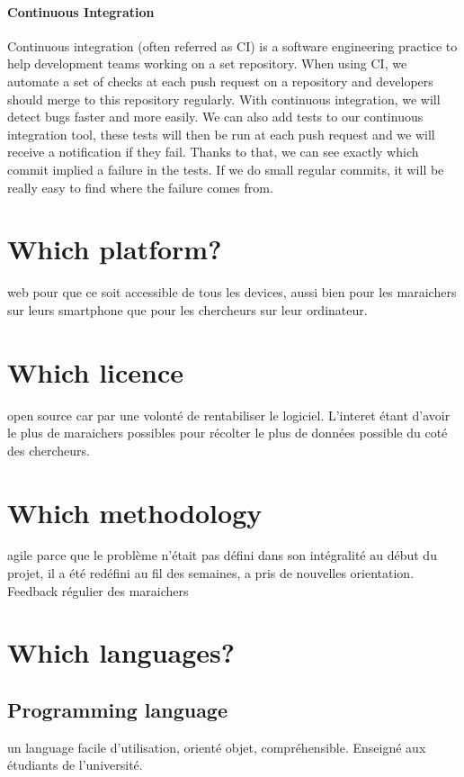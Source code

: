 \paragraph{Continuous Integration}
Continuous integration (often referred as CI) is a software engineering practice to help development teams working on a set repository. 
When using CI, we automate a set of checks at each push request on a repository and developers should merge to this repository regularly. With continuous integration, we will detect bugs faster and more easily. We can also add tests to our continuous integration tool, these tests will then be run at each push request and we will receive a notification if they fail. Thanks to that, we can see exactly which commit implied a failure in the tests. If we do small regular commits, it will be really easy to find where the failure comes from.



\section{Which platform?}
web pour que ce soit accessible de tous les devices, aussi bien pour les maraichers sur leurs smartphone que pour les chercheurs sur leur ordinateur.

\section{Which licence}
open source car par une volonté de rentabiliser le logiciel. L'interet étant d'avoir le plus de maraichers possibles pour récolter le plus de données possible du coté des chercheurs.

\section{Which methodology}
agile parce que le problème n'était pas défini dans son intégralité au début du projet, il a été redéfini au fil des semaines, a pris de nouvelles orientation. Feedback régulier des maraichers

\section{Which languages?}

\subsection{Programming language}
un language facile d'utilisation, orienté objet, compréhensible. Enseigné aux étudiants de l'université.
